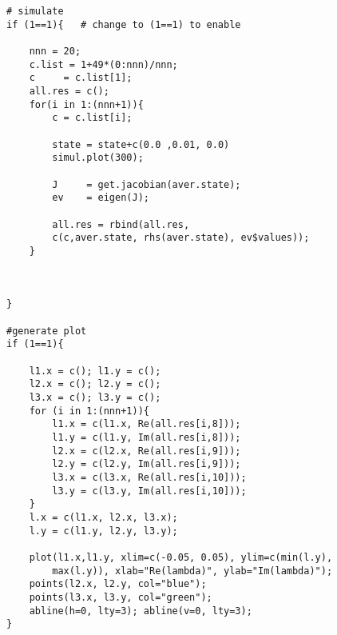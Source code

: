 \begin{lstlisting}
# simulate 	
if (1==1){   # change to (1==1) to enable
	
	nnn = 20;
	c.list = 1+49*(0:nnn)/nnn;
	c     = c.list[1];
	all.res = c();
	for(i in 1:(nnn+1)){
		c = c.list[i];
		
		state = state+c(0.0 ,0.01, 0.0)
		simul.plot(300); 
			
		J     = get.jacobian(aver.state);
		ev    = eigen(J);
		
		all.res = rbind(all.res, 
		c(c,aver.state, rhs(aver.state), ev$values));
	}
		
	
		
}
	
#generate plot	
if (1==1){
	
	l1.x = c(); l1.y = c();
	l2.x = c(); l2.y = c();
	l3.x = c(); l3.y = c();
	for (i in 1:(nnn+1)){
		l1.x = c(l1.x, Re(all.res[i,8]));  
		l1.y = c(l1.y, Im(all.res[i,8]));
		l2.x = c(l2.x, Re(all.res[i,9]));  
		l2.y = c(l2.y, Im(all.res[i,9]));
		l3.x = c(l3.x, Re(all.res[i,10])); 
		l3.y = c(l3.y, Im(all.res[i,10]));
	}
	l.x = c(l1.x, l2.x, l3.x);
	l.y = c(l1.y, l2.y, l3.y);
		
	plot(l1.x,l1.y, xlim=c(-0.05, 0.05), ylim=c(min(l.y), 
		max(l.y)), xlab="Re(lambda)", ylab="Im(lambda)");
	points(l2.x, l2.y, col="blue");
	points(l3.x, l3.y, col="green");
	abline(h=0, lty=3); abline(v=0, lty=3);
}
	
\end{lstlisting}
